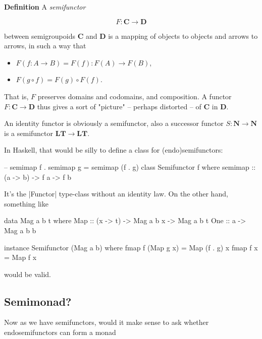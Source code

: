\documentclass{article}
\begin{document}
\textbf{Definition}
A \emph{semifunctor}

\begin{equation*}
F : \mathbf{C} \to \mathbf{D}
\end{equation*}

between semigroupoids $\mathbf{C}$ and $\mathbf{D}$ is a mapping of objects
to objects and arrows to arrows, in such a way that
\begin{itemize}
\item $F (f : A \to B) = F(f) : F(A) \to F(B)$,
\item $F(g \circ f) = F(g) \circ F(f)$.
\end{itemize}
That is, $F$ preserves domains and codomains,
and composition. A functor $F : \mathbf{C} \to \mathbf{D}$ thus gives
a sort of "picture" -- perhaps distorted -- of $\mathbf{C}$ in $\mathbf{D}$.

An identity functor is obviously a semifunctor, also a successor functor $S : \mathbf{N} \to \mathbf{N}$
is a semifunctor $\mathbf{LT} \to \mathbf{LT}$.

In Haskell, that would be silly to define a class for (endo)semifunctors:

\begin{code}
-- semimap f . semimap g = semimap (f . g)
class Semifunctor f where
    semimap :: (a -> b) -> f a -> f b
\end{code}

It's the |Functor| type-class without an identity law.
On the other hand, something like

\begin{code}
data Mag a b t where
    Map   :: (x -> t) -> Mag a b x -> Mag a b t
    One   :: a -> Mag a b b

instance Semifunctor (Mag a b) where
    fmap f (Map g x) = Map (f . g) x
    fmap f x         = Map f x
\end{code}

would be valid.

\subsection{Semimonad?}

Now as we have semifunctors, would it make sense to ask whether
endosemifunctors can form a monad
\end{document}
